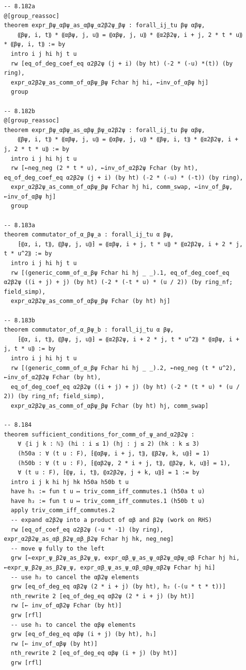 \documentclass[10pt,a4paper]{article}
\begin{document}
\begin{Verbatim}
-- 8.182a
@[group_reassoc]
theorem expr_βψ_αβψ_as_αβψ_α2β2ψ_βψ : forall_ij_tu βψ αβψ,
    ⸨βψ, i, t⸩ * ⸨αβψ, j, u⸩ = ⸨αβψ, j, u⸩ * ⸨α2β2ψ, i + j, 2 * t * u⸩ * ⸨βψ, i, t⸩ := by
  intro i j hi hj t u
  rw [eq_of_deg_coef_eq α2β2ψ (j + i) (by ht) (-2 * (-u) *(t)) (by ring),
  expr_α2β2ψ_as_comm_of_αβψ_βψ Fchar hj hi, ←inv_of_αβψ hj]
  group

-- 8.182b
@[group_reassoc]
theorem expr_βψ_αβψ_as_αβψ_βψ_α2β2ψ : forall_ij_tu βψ αβψ,
    ⸨βψ, i, t⸩ * ⸨αβψ, j, u⸩ = ⸨αβψ, j, u⸩ * ⸨βψ, i, t⸩ * ⸨α2β2ψ, i + j, 2 * t * u⸩ := by
  intro i j hi hj t u
  rw [←neg_neg (2 * t * u), ←inv_of_α2β2ψ Fchar (by ht), eq_of_deg_coef_eq α2β2ψ (j + i) (by ht) (-2 * (-u) * (-t)) (by ring),
  expr_α2β2ψ_as_comm_of_αβψ_βψ Fchar hj hi, comm_swap, ←inv_of_βψ, ←inv_of_αβψ hj]
  group

-- 8.183a
theorem commutator_of_α_βψ_a : forall_ij_tu α βψ,
    ⁅⸨α, i, t⸩, ⸨βψ, j, u⸩⁆ = ⸨αβψ, i + j, t * u⸩ * ⸨α2β2ψ, i + 2 * j, t * u^2⸩ := by
  intro i j hi hj t u
  rw [(generic_comm_of_α_βψ Fchar hi hj _ _).1, eq_of_deg_coef_eq α2β2ψ ((i + j) + j) (by ht) (-2 * (-t * u) * (u / 2)) (by ring_nf; field_simp),
  expr_α2β2ψ_as_comm_of_αβψ_βψ Fchar (by ht) hj]

-- 8.183b
theorem commutator_of_α_βψ_b : forall_ij_tu α βψ,
    ⁅⸨α, i, t⸩, ⸨βψ, j, u⸩⁆ = ⸨α2β2ψ, i + 2 * j, t * u^2⸩ * ⸨αβψ, i + j, t * u⸩ := by
  intro i j hi hj t u
  rw [(generic_comm_of_α_βψ Fchar hi hj _ _).2, ←neg_neg (t * u^2), ←inv_of_α2β2ψ Fchar (by ht),
  eq_of_deg_coef_eq α2β2ψ ((i + j) + j) (by ht) (-2 * (t * u) * (u / 2)) (by ring_nf; field_simp),
  expr_α2β2ψ_as_comm_of_αβψ_βψ Fchar (by ht) hj, comm_swap]

-- 8.184
theorem sufficient_conditions_for_comm_of_ψ_and_α2β2ψ :
    ∀ ⦃i j k : ℕ⦄ (hi : i ≤ 1) (hj : j ≤ 2) (hk : k ≤ 3)
    (h50a : ∀ (t u : F), ⁅⸨αβψ, i + j, t⸩, ⸨β2ψ, k, u⸩⁆ = 1)
    (h50b : ∀ (t u : F), ⁅⸨αβ2ψ, 2 * i + j, t⸩, ⸨β2ψ, k, u⸩⁆ = 1),
    ∀ (t u : F), ⁅⸨ψ, i, t⸩, ⸨α2β2ψ, j + k, u⸩⁆ = 1 := by
  intro i j k hi hj hk h50a h50b t u
  have h₁ := fun t u ↦ triv_comm_iff_commutes.1 (h50a t u)
  have h₂ := fun t u ↦ triv_comm_iff_commutes.1 (h50b t u)
  apply triv_comm_iff_commutes.2
  -- expand α2β2ψ into a product of αβ and β2ψ (work on RHS)
  rw [eq_of_coef_eq α2β2ψ (-u * -1) (by ring), expr_α2β2ψ_as_αβ_β2ψ_αβ_β2ψ Fchar hj hk, neg_neg]
  -- move ψ fully to the left
  grw [←expr_ψ_β2ψ_as_β2ψ_ψ, expr_αβ_ψ_as_ψ_αβ2ψ_αβψ_αβ Fchar hj hi, ←expr_ψ_β2ψ_as_β2ψ_ψ, expr_αβ_ψ_as_ψ_αβ_αβψ_αβ2ψ Fchar hj hi]
  -- use h₂ to cancel the αβ2ψ elements
  grw [eq_of_deg_eq αβ2ψ (2 * i + j) (by ht), h₂ (-(u * t * t))]
  nth_rewrite 2 [eq_of_deg_eq αβ2ψ (2 * i + j) (by ht)]
  rw [← inv_of_αβ2ψ Fchar (by ht)]
  grw [rfl]
  -- use h₁ to cancel the αβψ elements
  grw [eq_of_deg_eq αβψ (i + j) (by ht), h₁]
  rw [← inv_of_αβψ (by ht)]
  nth_rewrite 2 [eq_of_deg_eq αβψ (i + j) (by ht)]
  grw [rfl]
\end{Verbatim}
\end{document}
